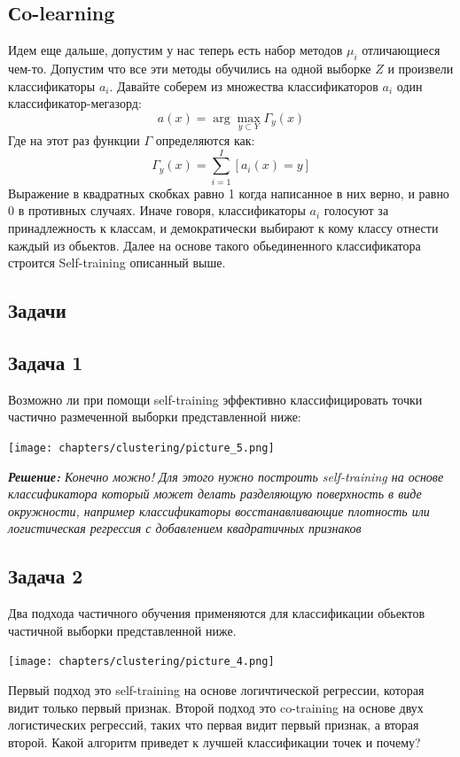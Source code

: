\subsection{Сo-learning}
Идем еще дальше, допустим у нас теперь есть набор методов $\mu_i$ отличающиеся чем-то. Допустим что все эти методы обучились на одной выборке $Z$ и произвели классификаторы $a_i$. Давайте соберем из множества классификаторов $a_i$ один классификатор-мегазорд:
\begin{equation*}
    a(x) = \arg \max_{y \subset Y}\Gamma_y(x)
\end{equation*}
Где на этот раз функции $\Gamma$ определяются как:
\begin{equation*}
    \Gamma_y(x) = \sum_{i = 1}^{I}[a_i(x) = y]
\end{equation*}
Выражение в квадратных скобках равно 1 когда написанное в них верно, и равно 0 в противных случаях. Иначе говоря, классификаторы $a_i$ голосуют за принадлежность к классам, и демократически выбирают к кому классу отнести каждый из обьектов. Далее на основе такого обьединенного классификатора строится Self-training описанный выше. 
\subsection{Задачи}
\subsection*{Задача 1}
Возможно ли при помощи self-training эффективно классифицировать точки частично размеченной выборки представленной ниже:
\begin{center}
\texttt{[image: chapters/clustering/picture\_5.png]}
\end{center}
\textit{\textbf{Решение:} Конечно можно! Для этого нужно построить self-training на основе классификатора который может делать разделяющую поверхность в виде окружности, например классификаторы восстанавливающие плотность или логистическая регрессия с добавлением квадратичных признаков}
\subsection*{Задача 2}
Два подхода частичного обучения применяются для классификации обьектов частичной выборки представленной ниже.
\begin{center}
\texttt{[image: chapters/clustering/picture\_4.png]}
\end{center}
Первый подход это self-training на основе логичтической регрессии, которая видит только первый признак. Второй подход это co-training на основе двух логистических регрессий, таких что первая видит первый признак, а вторая второй. Какой алгоритм приведет к лучшей классификации точек и почему?\\

